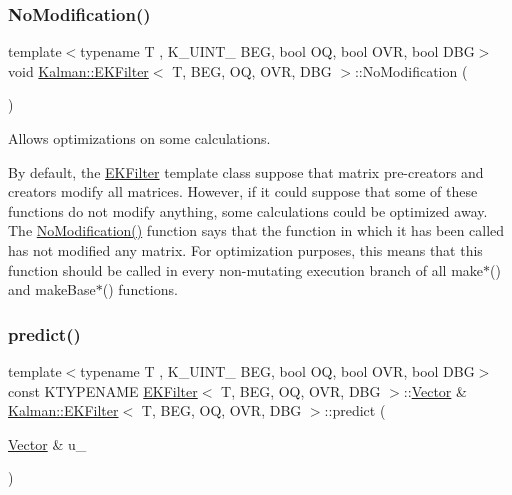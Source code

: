 \subsubsection{\texorpdfstring{No\+Modification()}{NoModification()}}
{\footnotesize\ttfamily template$<$typename T , K\+\_\+\+U\+I\+N\+T\+\_ B\+EG, bool OQ, bool O\+VR, bool D\+BG$>$ \\
void \mbox{\hyperlink{classKalman_1_1EKFilter}{Kalman\+::\+E\+K\+Filter}}$<$ T, B\+EG, OQ, O\+VR, D\+BG $>$\+::No\+Modification (\begin{DoxyParamCaption}{ }\end{DoxyParamCaption})\hspace{0.3cm}{\ttfamily [protected]}}



Allows optimizations on some calculations. 

By default, the \mbox{\hyperlink{classKalman_1_1EKFilter}{E\+K\+Filter}} template class suppose that matrix pre-\/creators and creators modify all matrices. However, if it could suppose that some of these functions do not modify anything, some calculations could be optimized away. The {\ttfamily \mbox{\hyperlink{classKalman_1_1EKFilter_ae3350773ed390892c2dd6dfe9dfbca89}{No\+Modification()}}} function says that the function in which it has been called has not modified any matrix. For optimization purposes, this means that this function should be called in every non-\/mutating execution branch of all {\ttfamily make$\ast$}() and {\ttfamily make\+Base$\ast$}() functions. \mbox{\label{classKalman_1_1EKFilter_a5f50329514f21971663ae6d4a26a1bb6}} 
\subsubsection{\texorpdfstring{predict()}{predict()}}
{\footnotesize\ttfamily template$<$typename T , K\+\_\+\+U\+I\+N\+T\+\_ B\+EG, bool OQ, bool O\+VR, bool D\+BG$>$ \\
const K\+T\+Y\+P\+E\+N\+A\+ME \mbox{\hyperlink{classKalman_1_1EKFilter}{E\+K\+Filter}}$<$ T, B\+EG, OQ, O\+VR, D\+BG $>$\+::\mbox{\hyperlink{classKalman_1_1EKFilter_af773d1217ecb01925b857d49b32bc636}{Vector}} \& \mbox{\hyperlink{classKalman_1_1EKFilter}{Kalman\+::\+E\+K\+Filter}}$<$ T, B\+EG, OQ, O\+VR, D\+BG $>$\+::predict (\begin{DoxyParamCaption}\item[{\mbox{\hyperlink{classKalman_1_1EKFilter_af773d1217ecb01925b857d49b32bc636}{Vector}} \&}]{u\+\_\+ }\end{DoxyParamCaption})}



